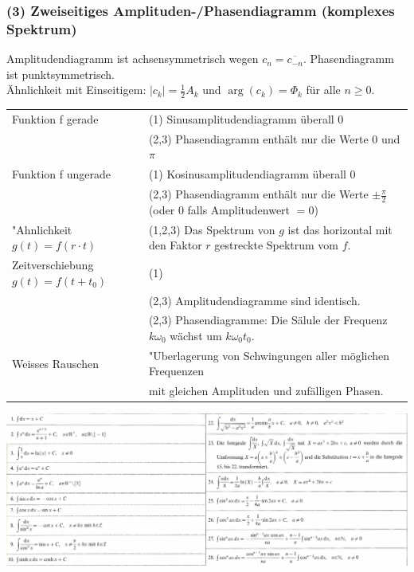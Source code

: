 \subsubsection{(3) Zweiseitiges Amplituden-/Phasendiagramm (komplexes Spektrum)} 
Amplitudendiagramm ist achsensymmetrisch wegen $ c_n=\overline{c_{-n}} $. Phasendiagramm ist punktsymmetrisch. \\
Ähnlichkeit mit Einseitigem: $|c_k| = \frac{1}{2}A_k $ und $\arg(c_k) = \Phi_k$ für alle $ n \geq 0$.

\begin{tabular}{ll}
	Funktion f gerade 
	& (1) Sinusamplitudendiagramm überall 0 \\
	& (2,3) Phasendiagramm enthält nur die Werte $0$ und $\pi$ \\
	Funktion f ungerade
	& (1) Kosinusamplitudendiagramm überall 0 \\
	& (2,3) Phasendiagramm enthält nur die Werte $\pm \frac{\pi}{2}$ (oder $0$ falls Amplitudenwert $=0$) \\
	"Ahnlichkeit $g(t) = f(r \cdot t) $
	& (1,2,3) Das Spektrum von $g$ ist das horizontal mit den Faktor $r$ gestreckte Spektrum vom $f$. \\
	Zeitverschiebung $g(t) = f(t + t_0) $
	& (1) \verweis{Fourier_Zeitverschiebung}{Zeitverschiebung} \\
	& (2,3) Amplitudendiagramme sind identisch. \\
	& (2,3) Phasendiagramme: Die Sälule der Frequenz $k \omega_0$ wächst um $k\omega_0 t_0$. \\
	Weisses Rauschen
	& "Uberlagerung von Schwingungen aller möglichen Frequenzen \\
	& mit gleichen Amplituden und zufälligen Phasen. 

\end{tabular}

\begin{center}
\includegraphics[width=18cm]{./bilder/integral1.png}
\end{center}





